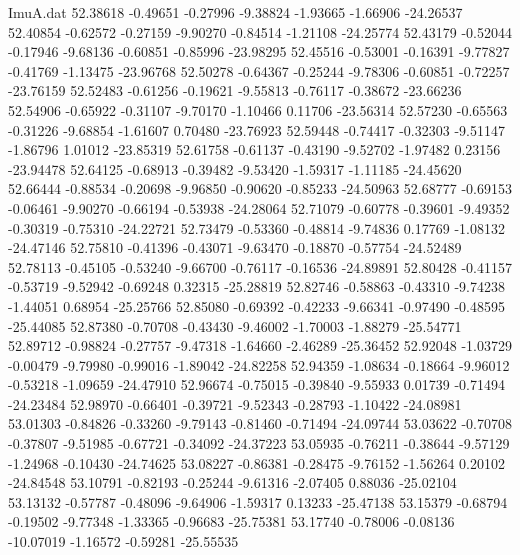 \begin{filecontents}{ImuA.dat}
  52.38618   -0.49651   -0.27996   -9.38824   -1.93665   -1.66906  -24.26537
  52.40854   -0.62572   -0.27159   -9.90270   -0.84514   -1.21108  -24.25774
  52.43179   -0.52044   -0.17946   -9.68136   -0.60851   -0.85996  -23.98295
  52.45516   -0.53001   -0.16391   -9.77827   -0.41769   -1.13475  -23.96768
  52.50278   -0.64367   -0.25244   -9.78306   -0.60851   -0.72257  -23.76159
  52.52483   -0.61256   -0.19621   -9.55813   -0.76117   -0.38672  -23.66236
  52.54906   -0.65922   -0.31107   -9.70170   -1.10466    0.11706  -23.56314
  52.57230   -0.65563   -0.31226   -9.68854   -1.61607    0.70480  -23.76923
  52.59448   -0.74417   -0.32303   -9.51147   -1.86796    1.01012  -23.85319
  52.61758   -0.61137   -0.43190   -9.52702   -1.97482    0.23156  -23.94478
  52.64125   -0.68913   -0.39482   -9.53420   -1.59317   -1.11185  -24.45620
  52.66444   -0.88534   -0.20698   -9.96850   -0.90620   -0.85233  -24.50963
  52.68777   -0.69153   -0.06461   -9.90270   -0.66194   -0.53938  -24.28064
  52.71079   -0.60778   -0.39601   -9.49352   -0.30319   -0.75310  -24.22721
  52.73479   -0.53360   -0.48814   -9.74836    0.17769   -1.08132  -24.47146
  52.75810   -0.41396   -0.43071   -9.63470   -0.18870   -0.57754  -24.52489
  52.78113   -0.45105   -0.53240   -9.66700   -0.76117   -0.16536  -24.89891
  52.80428   -0.41157   -0.53719   -9.52942   -0.69248    0.32315  -25.28819
  52.82746   -0.58863   -0.43310   -9.74238   -1.44051    0.68954  -25.25766
  52.85080   -0.69392   -0.42233   -9.66341   -0.97490   -0.48595  -25.44085
  52.87380   -0.70708   -0.43430   -9.46002   -1.70003   -1.88279  -25.54771
  52.89712   -0.98824   -0.27757   -9.47318   -1.64660   -2.46289  -25.36452
  52.92048   -1.03729   -0.00479   -9.79980   -0.99016   -1.89042  -24.82258
  52.94359   -1.08634   -0.18664   -9.96012   -0.53218   -1.09659  -24.47910
  52.96674   -0.75015   -0.39840   -9.55933    0.01739   -0.71494  -24.23484
  52.98970   -0.66401   -0.39721   -9.52343   -0.28793   -1.10422  -24.08981
  53.01303   -0.84826   -0.33260   -9.79143   -0.81460   -0.71494  -24.09744
  53.03622   -0.70708   -0.37807   -9.51985   -0.67721   -0.34092  -24.37223
  53.05935   -0.76211   -0.38644   -9.57129   -1.24968   -0.10430  -24.74625
  53.08227   -0.86381   -0.28475   -9.76152   -1.56264    0.20102  -24.84548
  53.10791   -0.82193   -0.25244   -9.61316   -2.07405    0.88036  -25.02104
  53.13132   -0.57787   -0.48096   -9.64906   -1.59317    0.13233  -25.47138
  53.15379   -0.68794   -0.19502   -9.77348   -1.33365   -0.96683  -25.75381
  53.17740   -0.78006   -0.08136  -10.07019   -1.16572   -0.59281  -25.55535

\end{filecontents}
